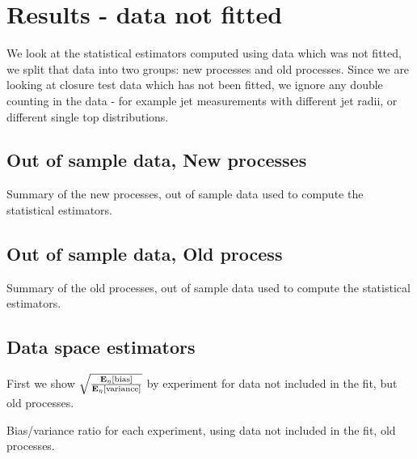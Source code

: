 \section{Results - data not fitted}

We look at the statistical estimators computed using data which was not fitted,
we split that data into two groups: new processes and old processes. Since we
are looking at closure test data which has not been fitted, we ignore any double
counting in the data - for example jet measurements with different jet radii, or
different single top distributions.

\subsection{Out of sample data, New processes}

\begin{table}[h!]
    \label{tab:summarise_fullout_data}
    
    \caption{Summary of the new processes, out of sample data used to compute the statistical estimators.}
\end{table}

\subsection{Out of sample data, Old process}

\begin{table}[h!]
    \label{tab:summarise_partial_data}
    
    \caption{Summary of the old processes, out of sample data used to compute the statistical estimators.}
\end{table}

\FloatBarrier

\subsection{Data space estimators}

First we show $\sqrt{\frac{\mathbf{E}_{\eta}\left[ {\rm bias} \right]}{\mathbf{E}_{\eta}\left[ {\rm variance} \right]}}$ by experiment for
data not included in the fit, but old processes.

\begin{table}[h!]
    \label{tab:partialout_sqrt_ratio}
    
    \caption{Bias/variance ratio for each experiment, using data not included in the fit, old processes.}
\end{table}

